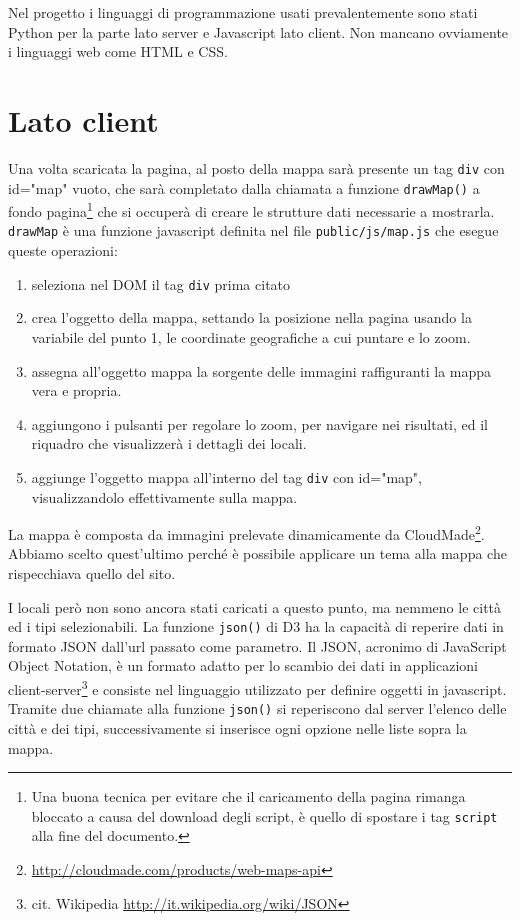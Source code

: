 Nel progetto i linguaggi di programmazione usati prevalentemente sono stati Python per la parte lato server e Javascript lato client. Non mancano ovviamente i linguaggi web come HTML e CSS.

\section{Lato client}
Una volta scaricata la pagina, al posto della mappa sarà presente un tag \texttt{div} con id="map" vuoto, che sarà completato dalla chiamata a funzione \texttt{drawMap()} a fondo pagina\footnote{Una buona tecnica per evitare che il caricamento della pagina rimanga bloccato a causa del download degli script, è quello di spostare i tag \texttt{script} alla fine del documento.} che si occuperà di creare le strutture dati necessarie a mostrarla. 
\texttt{drawMap} è una funzione javascript definita nel file \texttt{public/js/map.js} che esegue queste operazioni:
\begin{enumerate}
\item seleziona nel DOM il tag \texttt{div} prima citato
\item crea l'oggetto della mappa, settando la posizione nella pagina usando la variabile del punto 1, le coordinate geografiche a cui puntare e lo zoom.
\item assegna all'oggetto mappa la sorgente delle immagini raffiguranti la mappa vera e propria.
\item aggiungono i pulsanti per regolare lo zoom, per navigare nei risultati, ed il riquadro che visualizzerà i dettagli dei locali.
\item aggiunge l'oggetto mappa all'interno del tag \texttt{div} con id="map", visualizzandolo effettivamente sulla mappa.
\end{enumerate}

La mappa è composta da immagini prelevate dinamicamente da CloudMade\footnote{\url{http://cloudmade.com/products/web-maps-api}}. Abbiamo scelto quest'ultimo perché è possibile applicare un tema alla mappa che rispecchiava quello del sito.

I locali però non sono ancora stati caricati a questo punto, ma nemmeno le città ed i tipi selezionabili. La funzione \texttt{json()} di D3 ha la capacità di reperire dati in formato JSON dall'url passato come parametro. Il JSON, acronimo di JavaScript Object Notation, è un formato adatto per lo scambio dei dati in applicazioni client-server\footnote{cit. Wikipedia \url{http://it.wikipedia.org/wiki/JSON}} e consiste nel linguaggio utilizzato per definire oggetti in javascript. Tramite due chiamate alla funzione \texttt{json()} si reperiscono dal server l'elenco delle città e dei tipi, successivamente si inserisce ogni opzione nelle liste sopra la mappa.

